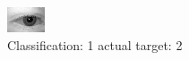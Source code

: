 \begin{figure}[h!]
\begin{center}
\includegraphics[width=0.60\columnwidth]{figures/ID437_class_1_target_2.png}
\end{center}
\caption{ Classification: 1 actual target: 2}
\label{fig:ID437_class_1_target_2}
\end{figure}
